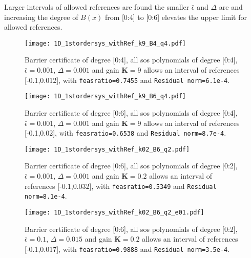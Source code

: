 Larger intervals of allowed references are found the smaller $\bar{\epsilon}$ and $\Delta$ are and increasing the degree of $B(x)$ from [0:4] to [0:6] elevates the upper limit for allowed references.




\begin{figure}[htbp]
\centering
\texttt{[image: 1D\_1stordersys\_withRef\_k9\_B4\_q4.pdf]}
\caption{Barrier certificate of degree [0:4], all \gls{sos} polynomials of degree [0:4], $\bar{\epsilon}=0.001$, $\Delta=0.001$ and gain $\textbf{K}=9$ allows an interval of references [-0.1,0.012], with \texttt{feasratio=0.7455} and \texttt{Residual norm=6.1e-4}.}
\label{fig:1D_1stordersys_withRef_k9_B4_q4}
\end{figure}


\begin{figure}[htbp]
\centering
\texttt{[image: 1D\_1stordersys\_withRef\_k9\_B6\_q4.pdf]}
\caption{Barrier certificate of degree [0:6], all \gls{sos} polynomials of degree [0:4], $\bar{\epsilon}=0.001$, $\Delta=0.001$ and gain $\textbf{K}=9$ allows an interval of references [-0.1,0.02], with \texttt{feasratio=0.6538} and \texttt{Residual norm=8.7e-4}.}
\label{fig:1D_1stordersys_withRef_k9_B6_XuX0}
\end{figure}


\begin{figure}[htbp]
\centering
\texttt{[image: 1D\_1stordersys\_withRef\_k02\_B6\_q2.pdf]}
\caption{Barrier certificate of degree [0:6], all \gls{sos} polynomials of degree [0:2], $\bar{\epsilon}=0.001$, $\Delta=0.001$ and gain $\textbf{K}=0.2$ allows an interval of references [-0.1,0.032], with \texttt{feasratio=0.5349} and \texttt{Residual norm=8.1e-4}.}
\label{fig:1D_1stordersys_withRef_k02_B6_q2_XuX0}
\end{figure}

\begin{figure}[htbp]
\centering
\texttt{[image: 1D\_1stordersys\_withRef\_k02\_B6\_q2\_e01.pdf]}
\caption{Barrier certificate of degree [0:6], all \gls{sos} polynomials of degree [0:2], $\bar{\epsilon}=0.1$, $\Delta=0.015$ and gain $\textbf{K}=0.2$ allows an interval of references [-0.1,0.017], with \texttt{feasratio=0.9888} and \texttt{Residual norm=3.5e-4}.}
\label{fig:1D_1stordersys_withRef_k02_B6_q2_e01}
\end{figure}


